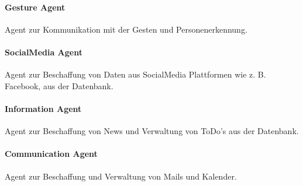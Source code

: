 \documentclass[10pt,a4paper]{report}
\begin{document}
        \paragraph{Gesture Agent}
            Agent zur Kommunikation mit der Gesten und Personenerkennung.
        \paragraph{SocialMedia Agent}
            Agent zur Beschaffung von Daten aus
            SocialMedia Plattformen wie z. B. Facebook, aus der Datenbank.
        \paragraph{Information Agent}
            Agent zur Beschaffung von News und Verwaltung
            von ToDo's aus der Datenbank.
        \paragraph{Communication Agent}
            Agent zur Beschaffung und Verwaltung von
            Mails und Kalender.
\end{document}
